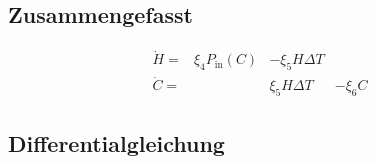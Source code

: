 \begin{refsection}
\subsection{Zusammengefasst}

\begin{equation}
	\begin{matrix}			
		\dot{H} = & \xi_4 P_{\text{in}}(C) & - \xi_5 H \Delta T & \\
		\dot{C} = &                       &   \xi_5 H \Delta T & - \xi_6 C
	\end{matrix}	
\end{equation}


%
%
%
%
%
%
%
%
%
%

\subsection{Differentialgleichung}


\end{refsection}

